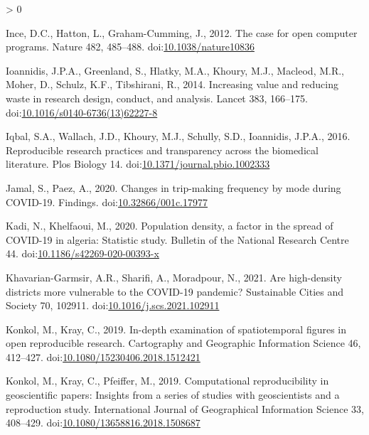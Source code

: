 \documentclass[]{elsarticle} %
\newlength{\cslhangindent}
\newenvironment{CSLReferences}[2] %
 {%
  \setlength{\parindent}{0pt}
  \ifodd #1 \everypar{\setlength{\hangindent}{\cslhangindent}}\ignorespaces\fi
  \ifnum #2 > 0
  \setlength{\parskip}{#2\baselineskip}
  \fi
 }%
 {}
\begin{document}
\begin{CSLReferences}{1}{0}
\leavevmode\hypertarget{ref-Ince2012case}{}%
Ince, D.C., Hatton, L., Graham-Cumming, J., 2012. The case for open
computer programs. Nature 482, 485--488.
doi:\href{https://doi.org/10.1038/nature10836}{10.1038/nature10836}

\leavevmode\hypertarget{ref-Ioannidis2014increasing}{}%
Ioannidis, J.P.A., Greenland, S., Hlatky, M.A., Khoury, M.J., Macleod,
M.R., Moher, D., Schulz, K.F., Tibshirani, R., 2014. Increasing value
and reducing waste in research design, conduct, and analysis. Lancet
383, 166--175.
doi:\href{https://doi.org/10.1016/s0140-6736(13)62227-8}{10.1016/s0140-6736(13)62227-8}

\leavevmode\hypertarget{ref-Iqbal2016reproducible}{}%
Iqbal, S.A., Wallach, J.D., Khoury, M.J., Schully, S.D., Ioannidis,
J.P.A., 2016. Reproducible research practices and transparency across
the biomedical literature. Plos Biology 14.
doi:\href{https://doi.org/10.1371/journal.pbio.1002333}{10.1371/journal.pbio.1002333}

\leavevmode\hypertarget{ref-Jamal2020Changes}{}%
Jamal, S., Paez, A., 2020. Changes in trip-making frequency by mode
during COVID-19. Findings.
doi:\href{https://doi.org/10.32866/001c.17977}{10.32866/001c.17977}

\leavevmode\hypertarget{ref-Kadi2020population}{}%
Kadi, N., Khelfaoui, M., 2020. Population density, a factor in the
spread of COVID-19 in algeria: Statistic study. Bulletin of the National
Research Centre 44.
doi:\href{https://doi.org/10.1186/s42269-020-00393-x}{10.1186/s42269-020-00393-x}

\leavevmode\hypertarget{ref-Khavarian2021high}{}%
Khavarian-Garmsir, A.R., Sharifi, A., Moradpour, N., 2021. Are
high-density districts more vulnerable to the COVID-19 pandemic?
Sustainable Cities and Society 70, 102911.
doi:\href{https://doi.org/10.1016/j.scs.2021.102911}{10.1016/j.scs.2021.102911}

\leavevmode\hypertarget{ref-Konkol2019examination}{}%
Konkol, M., Kray, C., 2019. In-depth examination of spatiotemporal
figures in open reproducible research. Cartography and Geographic
Information Science 46, 412--427.
doi:\href{https://doi.org/10.1080/15230406.2018.1512421}{10.1080/15230406.2018.1512421}

\leavevmode\hypertarget{ref-Konkol2019computational}{}%
Konkol, M., Kray, C., Pfeiffer, M., 2019. Computational reproducibility
in geoscientific papers: Insights from a series of studies with
geoscientists and a reproduction study. International Journal of
Geographical Information Science 33, 408--429.
doi:\href{https://doi.org/10.1080/13658816.2018.1508687}{10.1080/13658816.2018.1508687}


\end{CSLReferences}
\end{document}

